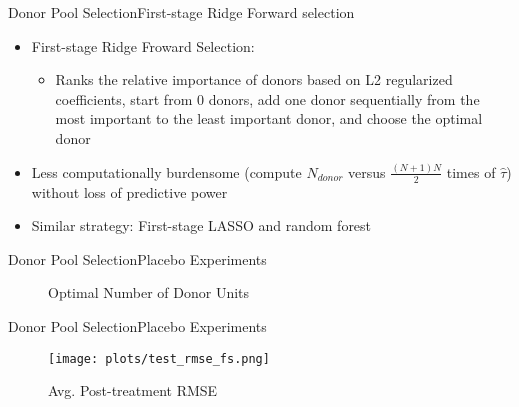 \documentclass{beamer}
\theoremstyle{definition}
\begin{document}
\begin{frame}{Donor Pool Selection}{First-stage Ridge Forward selection}

\begin{itemize}
\setlength{\itemsep}{18pt}
    \item First-stage Ridge Froward Selection:
    \begin{itemize}
    \setlength{\itemsep}{8pt}
        \item Ranks the relative importance of donors based on L2 regularized coefficients, start from 0 donors, add one donor sequentially from the most important to the least important donor, and choose the optimal donor
    \end{itemize}
    \item Less computationally burdensome (compute $N_{donor}$ versus $\frac{(N+1)N}{2}$ times of $\hat{\tau}$) without loss of predictive power
    \item Similar strategy: First-stage LASSO and random forest %

\end{itemize}
    
\end{frame}


\begin{frame}{Donor Pool Selection}{Placebo Experiments}
\begin{figure}[t]
    \caption{Optimal Number of Donor Units}
    \centering
    \hspace{1cm}
    \label{fig:optimal-donor}
\end{figure}

    
\end{frame}


\begin{frame}{Donor Pool Selection}{Placebo Experiments}
\begin{figure}[t]
    \centering
    \texttt{[image: plots/test\_rmse\_fs.png]}
    \caption{Avg. Post-treatment RMSE}
    \label{fig:rmse}
\end{figure}
\end{frame}
\end{document}
